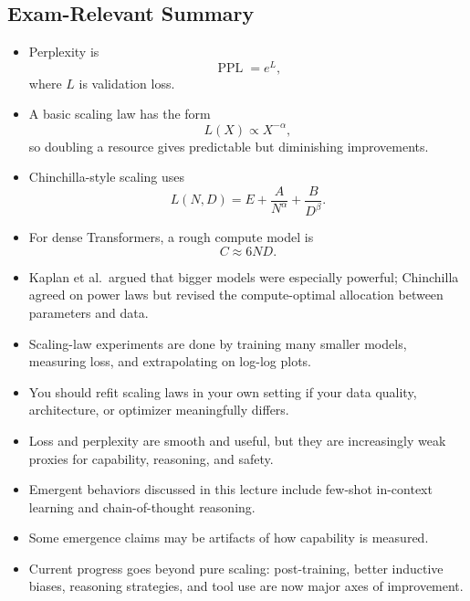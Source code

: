 \documentclass[11pt]{article}
\begin{document}
\subsection{Exam-Relevant Summary}
\begin{itemize}
    \item Perplexity is
    \[
    \operatorname{PPL}=e^L,
    \]
    where \(L\) is validation loss.
    \item A basic scaling law has the form
    \[
    L(X)\propto X^{-\alpha},
    \]
    so doubling a resource gives predictable but diminishing improvements.
    \item Chinchilla-style scaling uses
    \[
    L(N,D)=E+\frac{A}{N^\alpha}+\frac{B}{D^\beta}.
    \]
    \item For dense Transformers, a rough compute model is
    \[
    C \approx 6ND.
    \]
    \item Kaplan et al.\ argued that bigger models were especially powerful; Chinchilla agreed on power laws but revised the compute-optimal allocation between parameters and data.
    \item Scaling-law experiments are done by training many smaller models, measuring loss, and extrapolating on log-log plots.
    \item You should refit scaling laws in your own setting if your data quality, architecture, or optimizer meaningfully differs.
    \item Loss and perplexity are smooth and useful, but they are increasingly weak proxies for capability, reasoning, and safety.
    \item Emergent behaviors discussed in this lecture include few-shot in-context learning and chain-of-thought reasoning.
    \item Some emergence claims may be artifacts of how capability is measured.
    \item Current progress goes beyond pure scaling: post-training, better inductive biases, reasoning strategies, and tool use are now major axes of improvement.
\end{itemize}
\end{document}
